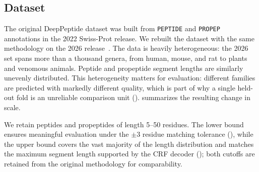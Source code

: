 \documentclass{article}
\begin{document}
\subsection{Dataset}
\label{sec:dataset}


The original DeepPeptide dataset was built from \texttt{PEPTIDE} and \texttt{PROPEP} annotations in the 2022 Swiss-Prot release. We rebuilt the dataset with the same methodology on the 2026 release~\citep{uniprot2025}. The data is heavily heterogeneous: the 2026 set spans more than a thousand genera, from human, mouse, and rat to plants and venomous animals. %
Peptide and propeptide segment lengths are similarly unevenly distributed.%
This heterogeneity matters for evaluation: different families are predicted with markedly different quality, which is part of why a single held-out fold is an unreliable comparison unit ().  summarizes the resulting change in scale.

\begin{table}[h]
\centering
\caption{Dataset composition: 2022 release (as used by the original DeepPeptide) vs.\ the 2026 release rebuilt for this work.}
\label{tab:dataset}
\small
{}
\end{table}

We retain peptides and propeptides of length 5--50 residues. The lower bound ensures meaningful evaluation under the $\pm3$ residue matching tolerance (), while the upper bound covers the vast majority of the length distribution and matches the maximum segment length supported by the CRF decoder (); both cutoffs are retained from the original methodology for comparability.
\end{document}
